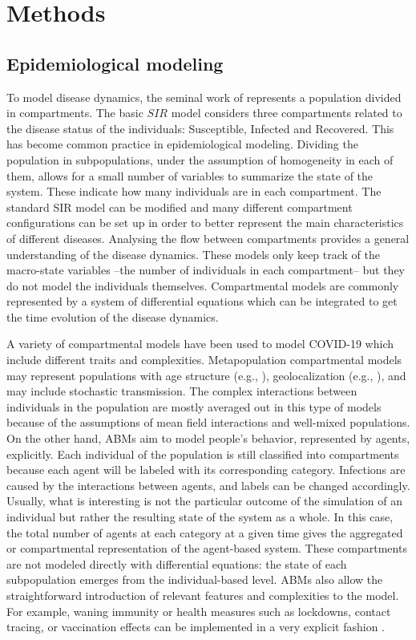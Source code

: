 \documentclass[11pt,a4paper]{article}
\begin{document}
\section{Methods}
\subsection{Epidemiological modeling} \label{sec:epi_models}

To model disease dynamics, the seminal work of \cite{Kermack1927} represents a population divided in compartments. The basic $SIR$ model considers three compartments related to the disease status of the individuals: Susceptible, Infected and Recovered. This has become common practice in epidemiological modeling. Dividing the population in subpopulations, under the assumption of homogeneity in each of them, allows for a small number of variables to summarize the state of the system. These indicate how many individuals are in each compartment. The standard SIR model can be modified and many different compartment configurations can be set up in order to better represent the main characteristics of different diseases. Analysing the flow between compartments provides a general understanding of the disease dynamics. These models only keep track of the macro-state variables --the number of individuals in each compartment-- but they do not model the individuals themselves. Compartmental models are commonly represented by a system of differential equations which can be integrated to get the time evolution of the disease dynamics.

A variety of compartmental models have been used to model COVID-19 which include different traits and complexities. Metapopulation compartmental models may represent populations with age structure  (e.g., \cite{Evensen2020}), geolocalization (e.g., \cite{Arenas2020}), and may include stochastic transmission. The complex interactions between individuals in the population are mostly averaged out in this type of models because of the assumptions of mean field interactions and well-mixed populations. On the other hand, ABMs aim to model people's behavior, represented by agents, explicitly. Each individual of the population is still classified into compartments because each agent will be labeled with its corresponding category. Infections are caused by the interactions between agents, and labels can be changed accordingly. Usually, what is interesting is not the particular outcome of the simulation of an individual but rather the resulting state of the system as a whole. In this case, the total number of agents at each category at a given time gives the aggregated or compartmental representation of the agent-based system. These compartments are not modeled directly with differential equations: the state of each subpopulation emerges from the individual-based level. ABMs also allow the straightforward introduction of relevant features and complexities to the model. For example, waning immunity or health measures such as lockdowns, contact tracing, or vaccination effects can be implemented in a very explicit fashion \citep{Silva2020}.
\end{document}
